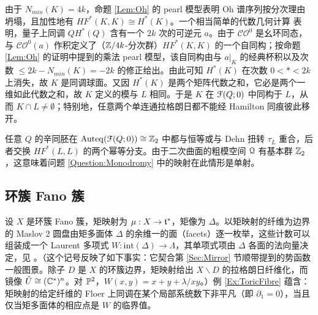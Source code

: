 由于 $N_{min}(K) = 4k$，命题 \ref{Lem:Oh} 的 pearl 模型表明 Oh 谱序列按分次理由坍塌，且加性地有 $HF^*(K,K) \cong H^*(K)$。一个相当简单的代数几何计算 \cite{Beauville} 表明，量子上同调 $QH^*(Q)$ 含有一个 $2k$ 次的可逆元 $a$。由于 $\mathcal{CO}^0$ 是幺环同态，与 $\mathcal{CO}^0(a)$ 作积定义了（$\bZ/4k$-分次群）$HF^*(K,K)$ 的一个自同构；按命题 \ref{Lem:Oh} 的证明中提到的乘法 pearl 模型，该自同构由与 $a|_K$ 的经典杯积以及次数 $\leq 2k-N_{min}(K) = -2k$ 的修正给出。由此可知 $H^*(K)$ 在次数 $0<\ast< 2k$ 上消失，故 $K$ 是同调球面。又因 $H^*(K)$ 是两个矩阵代数之和，它必是两个一维如此代数之和，故 $K$ 定义的模与 $L$ 相同。于是 $K$ 在 $\scrF(Q;0)$ 中同构于 $L$，从而 $K \cap L \neq \emptyset$；特别地，任意两个单连通拉格朗日都不能经 Hamilton 同痕彼此移开。


任意 $Q$ 的辛同胚在 $\Auteq(\scrF(Q;0)) \cong \bZ_2$ 中都与恒等或与 Dehn 扭转 $\tau_L$ 重合，后者交换 $HF^*(L,L)$ 的两个幂等分支。由于二次曲面的粗模空间 $\EuScript{Q}$ 有基本群 $\bZ_2$，这意味着问题 \ref{Question:Monodromy} 中的映射在此情形是单射。

\subsection{环簇 Fano 簇} 设 $X$ 是环簇 Fano 簇，矩映射为 $\mu: X \rightarrow \frak{t}^*$，矩像为 $\Delta$。以矩映射的纤维为边界的 Maslov 2 圆盘由矩多面体 $\Delta$ 的余维一的面（facets）逐一枚举，这些计数可以组装成一个 Laurent 多项式 $W: \mathrm{int}(\Delta) \rightarrow \Lambda$，其单项式项由 $\Delta$ 各面的法向量决定，见 \cite{Cho,Cho-Oh}。（这个记号反映了如下事实：它契合第 \ref{Sec:Mirror} 节顺带提到的势函数一般图景。除子 $D$ 是 $X$ 的环簇边界，矩映射给出 $X\backslash D$ 的拉格朗日纤维化，而镜像 $\Cech{U} \cong (\bC^*)^n$。对 $\bP^2$，$W(x,y) = x+y+\lambda/xy$。）例 \ref{Ex:ToricFibre} 蕴含：矩映射的给定纤维的 Floer 上同调在某个局部系统数下非平凡（即 $\partial_1 = 0$），当且仅当矩多面体的相应点是 $W$ 的临界值。


